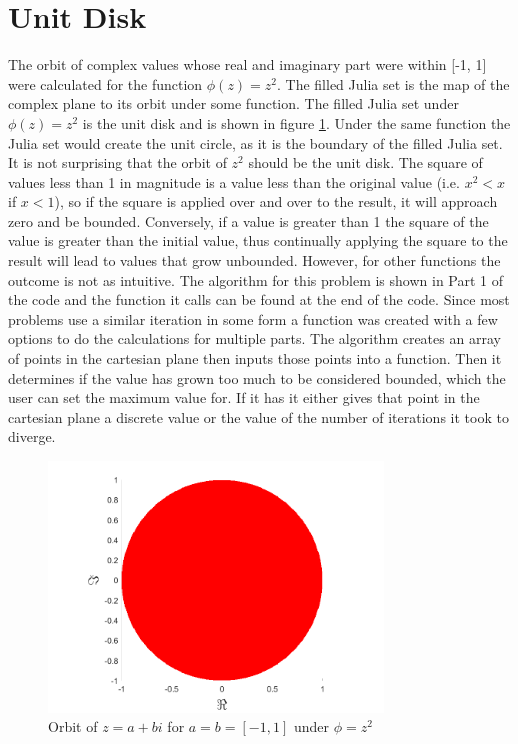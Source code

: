 \documentclass[letterpaper,11pt]{article}
\begin{document}
\section{Unit Disk}
The orbit of complex values whose real and imaginary part were within [-1, 1] were calculated for the function $\phi(z) = z^2$. The filled Julia set is the map of the complex plane to its orbit under some function. The filled Julia set under $\phi(z) = z^2$ is the unit disk and is shown in figure \ref{fig:unitDisk}. Under the same function the Julia set would create the unit circle, as it is the boundary of the filled Julia set. It is not surprising that the orbit of $z^2$ should be the unit disk. The square of values less than 1 in magnitude is a value less than the original value (i.e. $x^2 < x$ if $x < 1$), so if the square is applied over and over to the result, it will approach zero and be bounded. Conversely, if a value is greater than 1 the square of the value is greater than the initial value, thus continually applying the square to the result will lead to values that grow unbounded. However, for other functions the outcome is not as intuitive. The algorithm for this problem is shown in Part 1 of the code and the function it calls can be found at the end of the code. Since most problems use a similar iteration in some form a function was created with a few options to do the calculations for multiple parts. The algorithm creates an array of points in the cartesian plane then inputs those points into a function. Then it determines if the value has grown too much to be considered bounded, which the user can set the maximum value for. If it has it either gives that point in the cartesian plane a discrete value or the value of the number of iterations it took to diverge.

\begin{figure}
	\centering
	\includegraphics[width=3.5in]{../Figures/UnitDisk.png}
	\caption{Orbit of $z = a + bi$ for $a = b = [-1,1]$ under $\phi=z^2$}
	\label{fig:unitDisk}
\end{figure}
\end{document}
